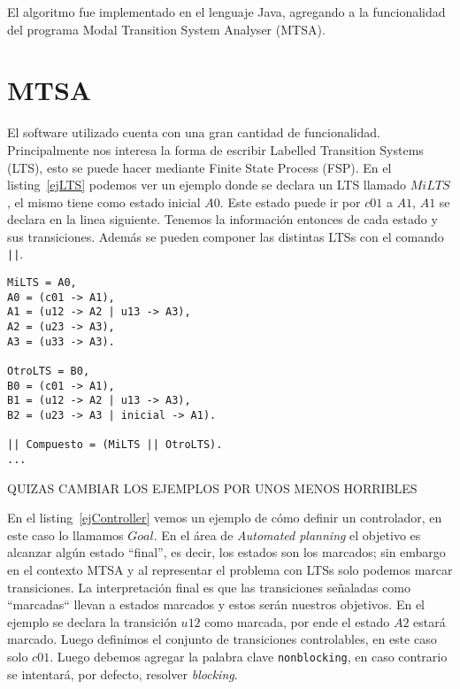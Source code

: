 
El algoritmo fue implementado en el lenguaje Java, agregando a la funcionalidad del programa Modal Transition System Analyser (MTSA)\cite{mtsaRepo}.

\section{MTSA}
El software utilizado cuenta con una gran cantidad de funcionalidad. Principalmente nos interesa la forma de escribir Labelled Transition Systems (LTS), esto se puede hacer mediante Finite State Process (FSP). En el listing~\ref{ejLTS} podemos ver un ejemplo donde se declara un LTS llamado $MiLTS$, el mismo tiene como estado inicial $A0$. Este estado puede ir por $c01$ a $A1$, $A1$ se declara en la linea siguiente. Tenemos la información entonces de cada estado y sus transiciones. Además se pueden componer las distintas LTSs con el comando \texttt{||}.

\begin{lstlisting}[language = mtsa, caption=Ejemplo de LTS y composición, label=ejLTS]
MiLTS = A0,
A0 = (c01 -> A1),
A1 = (u12 -> A2 | u13 -> A3),
A2 = (u23 -> A3),
A3 = (u33 -> A3).

OtroLTS = B0,
B0 = (c01 -> A1),
B1 = (u12 -> A2 | u13 -> A3),
B2 = (u23 -> A3 | inicial -> A1).

|| Compuesto = (MiLTS || OtroLTS).
...
\end{lstlisting}
QUIZAS CAMBIAR LOS EJEMPLOS POR UNOS MENOS HORRIBLES

En el listing~\ref{ejController} vemos un ejemplo de cómo definir un controlador, en este caso lo llamamos $Goal$. En el área de \textit{Automated planning} el objetivo es alcanzar algún estado ``final'', es decir, los estados son los marcados; sin embargo en el contexto MTSA y al representar el problema con LTSs solo podemos marcar transiciones. La interpretación final es que las transiciones señaladas como ``marcadas`` llevan a estados marcados y estos serán nuestros objetivos. En el ejemplo se declara la transición $u12$ como marcada, por ende el estado $A2$ estará marcado. Luego definimos el conjunto de transiciones controlables, en este caso solo $c01$. Luego debemos agregar la palabra clave \texttt{nonblocking}, en caso contrario se intentará, por defecto, resolver \textit{blocking}.

